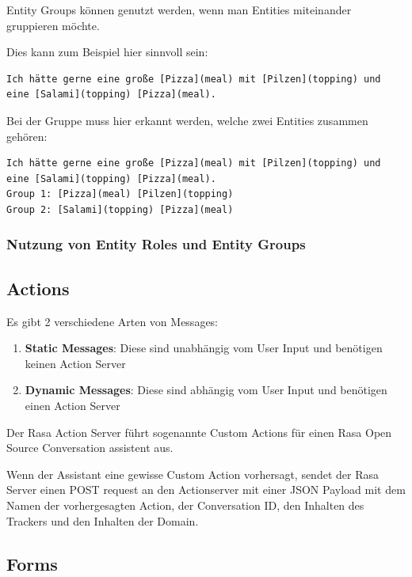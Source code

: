 Entity Groups können genutzt werden, wenn man Entities miteinander gruppieren möchte.\cite{entityRolesGroups}

Dies kann zum Beispiel hier sinnvoll sein:

\begin{lstlisting}[label={lst: Entity Groups Example 1}]
Ich hätte gerne eine große [Pizza](meal) mit [Pilzen](topping) und eine [Salami](topping) [Pizza](meal).
\end{lstlisting}

Bei der Gruppe muss hier erkannt werden, welche zwei Entities zusammen gehören\cite{entityRolesGroups}:

\begin{lstlisting}[label={lst: Entity Groups Example 2}]
Ich hätte gerne eine große [Pizza](meal) mit [Pilzen](topping) und eine [Salami](topping) [Pizza](meal).
Group 1: [Pizza](meal) [Pilzen](topping)
Group 2: [Salami](topping) [Pizza](meal)
\end{lstlisting}


\subsubsection{Nutzung von Entity Roles und Entity Groups}

\subsection{Actions}

Es gibt 2 verschiedene Arten von Messages:

\begin{enumerate}
  \item \textbf{Static Messages}: Diese sind unabhängig vom User Input und benötigen keinen Action Server\cite{actionsVid}
  \item \textbf{Dynamic Messages}: Diese sind abhängig vom User Input und benötigen einen Action Server\cite{actionsVid}
\end{enumerate}

Der Rasa Action Server führt sogenannte Custom Actions für einen Rasa Open Source Conversation assistent aus.

Wenn der Assistant eine gewisse Custom Action vorhersagt, sendet der Rasa Server einen POST request an den Actionserver mit einer JSON Payload mit dem Namen der vorhergesagten Action, der Conversation ID, den Inhalten des Trackers und den Inhalten der Domain.\cite{actions}

\subsection{Forms}

